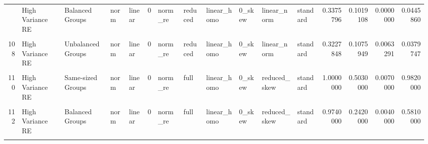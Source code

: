 \documentclass[12pt]{article}
\begin{document}
\begin{table}
{\begin{tabular}[t]{rllllrllllllrrrr}
\addlinespace
106 & High Variance RE & Balanced Groups & norm & linear & 0 & norm\_re & reduced & linear\_homo & 0\_skew & linear\_norm & standard & 0.3375796 & 0.1019108 & 0.0000000 & 0.0445860\\
\cellcolor{gray!6}{107} & \cellcolor{gray!6}{High Variance Error} & \cellcolor{gray!6}{Unbalanced Groups} & \cellcolor{gray!6}{norm} & \cellcolor{gray!6}{linear} & \cellcolor{gray!6}{0} & \cellcolor{gray!6}{norm\_re} & \cellcolor{gray!6}{reduced} & \cellcolor{gray!6}{linear\_homo} & \cellcolor{gray!6}{0\_skew} & \cellcolor{gray!6}{linear\_norm} & \cellcolor{gray!6}{standard} & \cellcolor{gray!6}{0.0443038} & \cellcolor{gray!6}{0.1139240} & \cellcolor{gray!6}{0.1518987} & \cellcolor{gray!6}{0.0253165}\\
108 & High Variance RE & Unbalanced Groups & norm & linear & 0 & norm\_re & reduced & linear\_homo & 0\_skew & linear\_norm & standard & 0.3227848 & 0.1075949 & 0.0063291 & 0.0379747\\
\cellcolor{gray!6}{109} & \cellcolor{gray!6}{High Variance Error} & \cellcolor{gray!6}{Same-sized Groups} & \cellcolor{gray!6}{norm} & \cellcolor{gray!6}{linear} & \cellcolor{gray!6}{0} & \cellcolor{gray!6}{norm\_re} & \cellcolor{gray!6}{full} & \cellcolor{gray!6}{linear\_homo} & \cellcolor{gray!6}{0\_skew} & \cellcolor{gray!6}{reduced\_skew} & \cellcolor{gray!6}{standard} & \cellcolor{gray!6}{1.0000000} & \cellcolor{gray!6}{0.8150000} & \cellcolor{gray!6}{0.0740000} & \cellcolor{gray!6}{0.5320000}\\
110 & High Variance RE & Same-sized Groups & norm & linear & 0 & norm\_re & full & linear\_homo & 0\_skew & reduced\_skew & standard & 1.0000000 & 0.5030000 & 0.0070000 & 0.9820000\\
\addlinespace
\cellcolor{gray!6}{111} & \cellcolor{gray!6}{High Variance Error} & \cellcolor{gray!6}{Balanced Groups} & \cellcolor{gray!6}{norm} & \cellcolor{gray!6}{linear} & \cellcolor{gray!6}{0} & \cellcolor{gray!6}{norm\_re} & \cellcolor{gray!6}{full} & \cellcolor{gray!6}{linear\_homo} & \cellcolor{gray!6}{0\_skew} & \cellcolor{gray!6}{reduced\_skew} & \cellcolor{gray!6}{standard} & \cellcolor{gray!6}{1.0000000} & \cellcolor{gray!6}{0.4990000} & \cellcolor{gray!6}{0.5950000} & \cellcolor{gray!6}{0.1110000}\\
112 & High Variance RE & Balanced Groups & norm & linear & 0 & norm\_re & full & linear\_homo & 0\_skew & reduced\_skew & standard & 0.9740000 & 0.2420000 & 0.0040000 & 0.5810000\\
\cellcolor{gray!6}{113} & \cellcolor{gray!6}{High Variance Error} & \cellcolor{gray!6}{Unbalanced Groups} & \cellcolor{gray!6}{norm} & \cellcolor{gray!6}{linear} & \cellcolor{gray!6}{0} & \cellcolor{gray!6}{norm\_re} & \cellcolor{gray!6}{full} & \cellcolor{gray!6}{linear\_homo} & \cellcolor{gray!6}{0\_skew} & \cellcolor{gray!6}{reduced\_skew} & \cellcolor{gray!6}{standard} & \cellcolor{gray!6}{0.9900000} & \cellcolor{gray!6}{0.4900000} & \cellcolor{gray!6}{0.7150000} & \cellcolor{gray!6}{0.0950000}\\

\end{tabular}}
\end{table}
\end{document}

